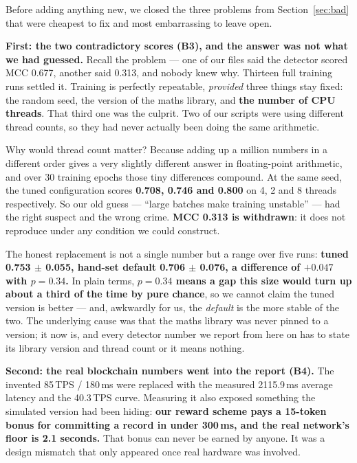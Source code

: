 \documentclass[11pt]{article}
\begin{document}
Before adding anything new, we closed the three problems from Section~\ref{sec:bad} that were cheapest
to fix and most embarrassing to leave open.

\textbf{First: the two contradictory scores (B3), and the answer was not what we had guessed.} Recall
the problem --- one of our files said the detector scored MCC 0.677, another said 0.313, and nobody knew
why. Thirteen full training runs settled it. Training is perfectly repeatable, \emph{provided} three
things stay fixed: the random seed, the version of the maths library, and \textbf{the number of CPU
threads}. That third one was the culprit. Two of our scripts were using different thread counts, so they
had never actually been doing the same arithmetic.

Why would thread count matter? Because adding up a million numbers in a different order gives a very
slightly different answer in floating-point arithmetic, and over 30 training epochs those tiny
differences compound. At the same seed, the tuned configuration scores \textbf{0.708, 0.746 and 0.800}
on 4, 2 and 8 threads respectively. So our old guess --- ``large batches make training unstable'' --- had
the right suspect and the wrong crime. \textbf{MCC 0.313 is withdrawn}: it does not reproduce under any
condition we could construct.

The honest replacement is not a single number but a range over five runs: \textbf{tuned 0.753
$\pm$ 0.055, hand-set default 0.706 $\pm$ 0.076, a difference of $+0.047$ with $p = 0.34$.} In plain
terms, \textbf{$p = 0.34$ means a gap this size would turn up about a third of the time by pure chance},
so we cannot claim the tuned version is better --- and, awkwardly for us, the \emph{default} is the more
stable of the two. The underlying cause was that the maths library was never pinned to a version; it now
is, and every detector number we report from here on has to state its library version and thread count
or it means nothing.

\textbf{Second: the real blockchain numbers went into the report (B4).} The invented 85\,TPS / 180\,ms
were replaced with the measured 2115.9\,ms average latency and the 40.3\,TPS curve. Measuring it also
exposed something the simulated version had been hiding: \textbf{our reward scheme pays a 15-token bonus
for committing a record in under 300\,ms, and the real network's floor is 2.1 seconds.} That bonus can
never be earned by anyone. It was a design mismatch that only appeared once real hardware was involved.
\end{document}
